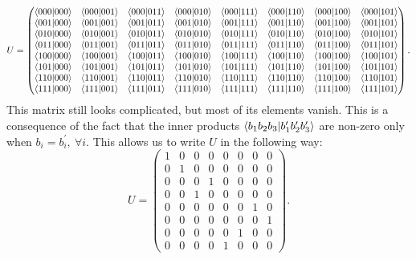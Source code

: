 \documentclass[10pt]{article}
\begin{document}
\begin{equation}
U=
  \begin{pmatrix}
    \braket{000|000} & \braket{000|001} & \braket{000|011} & \braket{000|010} & \braket{000|111} & \braket{000|110} & \braket{000|100} & \braket{000|101}\\
    \braket{001|000} & \braket{001|001} & \braket{001|011} & \braket{001|010} & \braket{001|111} & \braket{001|110} & \braket{001|100} & \braket{001|101}\\
    \braket{010|000} & \braket{010|001} & \braket{010|011} & \braket{010|010} & \braket{010|111} & \braket{010|110} & \braket{010|100} & \braket{010|101}\\
    \braket{011|000} & \braket{011|001} & \braket{011|011} & \braket{011|010} & \braket{011|111} & \braket{011|110} & \braket{011|100} & \braket{011|101}\\
    \braket{100|000} & \braket{100|001} & \braket{100|011} & \braket{100|010} & \braket{100|111} & \braket{100|110} & \braket{100|100} & \braket{100|101}\\
    \braket{101|000} & \braket{101|001} & \braket{101|011} & \braket{101|010} & \braket{101|111} & \braket{101|110} & \braket{101|100} & \braket{101|101}\\
    \braket{110|000} & \braket{110|001} & \braket{110|011} & \braket{110|010} & \braket{110|111} & \braket{110|110} & \braket{110|100} & \braket{110|101}\\
    \braket{111|000} & \braket{111|001} & \braket{111|011} & \braket{111|010} & \braket{111|111} & \braket{111|110} & \braket{111|100} & \braket{111|101}
  \end{pmatrix}.
\end{equation}
This matrix still looks complicated, but most of its elements vanish. This is a
consequence of the fact that the inner products
\(\braket{b_1b_2b_3|b_{1}^{\prime}b_{2}^{\prime}b_{3}^{\prime}}\)
are non-zero only when \(b_i=b_{i}^{\prime},\:\forall i\). This allows us to
write \(U\) in the following way:
\begin{equation}
U=
  \begin{pmatrix}
    1 & 0 & 0 & 0 & 0 & 0 & 0 & 0\\
    0 & 1 & 0 & 0 & 0 & 0 & 0 & 0\\
    0 & 0 & 0 & 1 & 0 & 0 & 0 & 0\\
    0 & 0 & 1 & 0 & 0 & 0 & 0 & 0\\
    0 & 0 & 0 & 0 & 0 & 0 & 1 & 0\\
    0 & 0 & 0 & 0 & 0 & 0 & 0 & 1\\
    0 & 0 & 0 & 0 & 0 & 1 & 0 & 0\\
    0 & 0 & 0 & 0 & 1 & 0 & 0 & 0
  \end{pmatrix}.
\end{equation}
\end{document}
